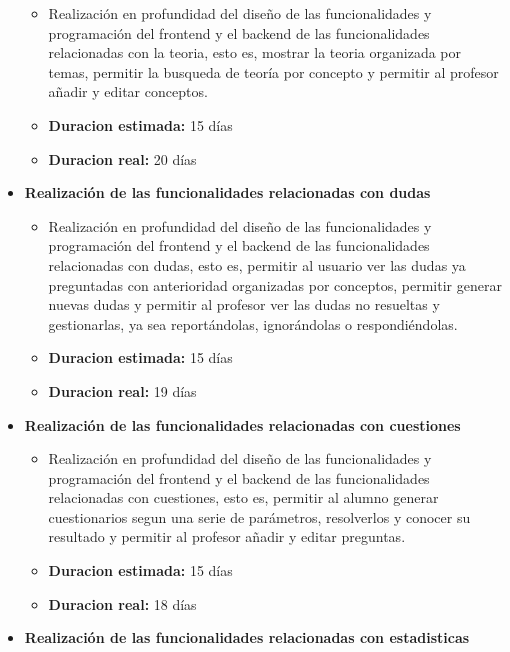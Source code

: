\documentclass[openright,twoside,10pt]{book}
\providecommand{\tightlist}{%
  \setlength{\itemsep}{0pt}\setlength{\parskip}{0pt}}
\begin{document}
\begin{itemize}
      \begin{itemize}
      \tightlist
      \item
        Realización en profundidad del diseño de las funcionalidades y
        programación del frontend y el backend de las funcionalidades
        relacionadas con la teoria, esto es, mostrar la teoria organizada
        por temas, permitir la busqueda de teoría por concepto y permitir al
        profesor añadir y editar conceptos.
      \item
        \textbf{Duracion estimada:} 15 días
      \item
        \textbf{Duracion real:} 20 días
      \end{itemize}
    \item
      \textbf{Realización de las funcionalidades relacionadas con dudas}
    
      \begin{itemize}
      \tightlist
      \item
        Realización en profundidad del diseño de las funcionalidades y
        programación del frontend y el backend de las funcionalidades
        relacionadas con dudas, esto es, permitir al usuario ver las dudas
        ya preguntadas con anterioridad organizadas por conceptos, permitir
        generar nuevas dudas y permitir al profesor ver las dudas no
        resueltas y gestionarlas, ya sea reportándolas, ignorándolas o
        respondiéndolas.
      \item
        \textbf{Duracion estimada:} 15 días
      \item
        \textbf{Duracion real:} 19 días
      \end{itemize}
    \item
      \textbf{Realización de las funcionalidades relacionadas con
      cuestiones}
    
      \begin{itemize}
      \tightlist
      \item
        Realización en profundidad del diseño de las funcionalidades y
        programación del frontend y el backend de las funcionalidades
        relacionadas con cuestiones, esto es, permitir al alumno generar
        cuestionarios segun una serie de parámetros, resolverlos y conocer
        su resultado y permitir al profesor añadir y editar preguntas.
      \item
        \textbf{Duracion estimada:} 15 días
      \item
        \textbf{Duracion real:} 18 días
      \end{itemize}
    \item
      \textbf{Realización de las funcionalidades relacionadas con
      estadisticas}
    

\end{itemize}
\end{document}
